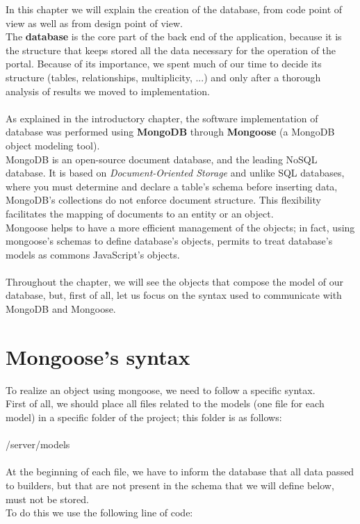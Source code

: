 



In this chapter we will explain the creation of the database, from code point of view as well as from design point of view.
\\The \textbf{database} is the core part of the back end of the application, because it is the structure that keeps stored all the data necessary for the operation of the portal. Because of its importance, we spent much of our time to decide its structure (tables, relationships, multiplicity, ...) and only after a thorough analysis of results we moved to implementation.
\\
\\As explained in the introductory chapter, the software implementation of database was performed using \textbf{MongoDB} through \textbf{Mongoose} (a MongoDB object modeling tool).
\\MongoDB is an open-source document database, and the leading NoSQL database. It is based on \emph{Document-Oriented Storage} and unlike SQL databases, where you must determine and declare a table's schema before inserting data, MongoDB’s collections do not enforce document structure. This flexibility facilitates the mapping of documents to an entity or an object.
\\Mongoose helps to have a more efficient management of the objects; in fact, using mongoose's schemas to define database's objects, permits to treat database's models as commons JavaScript's objects.
\\
\\Throughout the chapter, we will see the objects that compose the model of our database, but, first of all, let us focus on the syntax used to communicate with MongoDB and Mongoose.

\section{Mongoose's syntax}
To realize an object using mongoose, we need to follow a specific syntax.
\\First of all, we should place all files related to the models (one file for each model) in a specific folder of the project; this folder is as follows:
\\
\\/server/models
\\
\\At the beginning of each file, we have to inform the database that all data passed to builders, but that are not present in the schema that we will define below, must not be stored.
\\To do this we use the following line of code:

